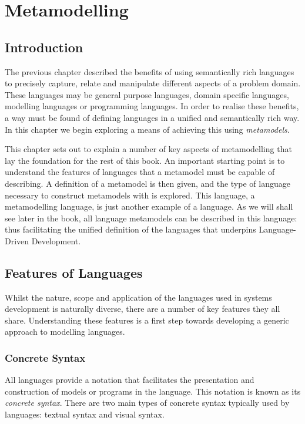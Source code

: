 \chapter{Metamodelling}
\label{metamodellingChapter}

\section{Introduction}

The previous chapter described the benefits of using semantically
rich languages to precisely capture, relate and manipulate
different aspects of a problem domain. These languages may be
general purpose languages, domain specific languages, modelling
languages or programming languages. In order to realise these
benefits, a way must be found of defining languages in a unified
and semantically rich way. In this chapter we begin exploring a
means of achieving this using {\em metamodels}.

This chapter sets out to explain a number of key aspects of
metamodelling that lay the foundation for the rest of this book.
An important starting point is to understand the features of
languages that a metamodel must be capable of describing. A
definition of a metamodel is then given, and the type of language
necessary to construct metamodels with is explored. This language,
a metamodelling language, is just another example of a language.
As we will shall see later in the book, all language metamodels
can be described in this language: thus facilitating the unified
definition of the languages that underpins Language-Driven
Development.

\section{Features of Languages} \label{syntaxsemantics}

Whilst the nature, scope and application of the languages used in
systems development is naturally diverse, there are a number of
key features they all share. Understanding these features is a
first step towards developing a generic approach to modelling
languages.

\subsection{Concrete Syntax}

All languages provide a notation that facilitates the presentation
and construction of models or programs in the language. This
notation is known as its \emph{concrete syntax}. There are two
main types of concrete syntax typically used by languages: textual
syntax and visual syntax.

